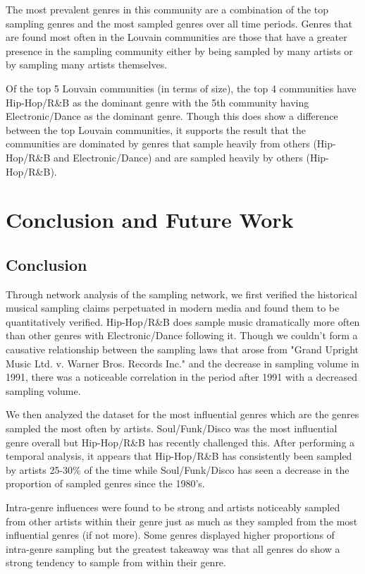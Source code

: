 \documentclass[pageno]{jpaper}
\begin{document}
The most prevalent genres in this community are a combination of the top sampling genres and the most sampled genres over all time periods. Genres that are found most often in the Louvain communities are those that have a greater presence in the sampling community either by being sampled by many artists or by sampling many artists themselves. 

Of the top 5 Louvain communities (in terms of size), the top 4 communities have Hip-Hop/R\&B as the dominant genre with the 5th community having Electronic/Dance as the dominant genre. Though this does show a difference between the top Louvain communities, it supports the result that the communities are dominated by genres that sample heavily from others (Hip-Hop/R\&B and Electronic/Dance) and are sampled heavily by others (Hip-Hop/R\&B). 
\section{Conclusion and Future Work}
\subsection{Conclusion}
Through network analysis of the sampling network, we first verified the historical musical sampling claims perpetuated in modern media and found them to be quantitatively verified. Hip-Hop/R\&B does sample music dramatically more often than other genres with Electronic/Dance following it. Though we couldn't form a causative relationship between the sampling laws that arose from "Grand Upright Music Ltd. v. Warner Bros. Records Inc." and the decrease in sampling volume in 1991, there was a noticeable correlation in the period after 1991 with a decreased sampling volume.

We then analyzed the dataset for the most influential genres which are the genres sampled the most often by artists. Soul/Funk/Disco was the most influential genre overall but Hip-Hop/R\&B has recently challenged this. After performing a temporal analysis, it appears that Hip-Hop/R\&B has consistently been sampled by artists 25-30\% of the time while Soul/Funk/Disco has seen a decrease in the proportion of sampled genres since the 1980's.

Intra-genre influences were found to be strong and artists noticeably sampled from other artists within their genre just as much as they sampled from the most influential genres (if not more). Some genres displayed higher proportions of intra-genre sampling but the greatest takeaway was that all genres do show a strong tendency to sample from within their genre.
\end{document}
